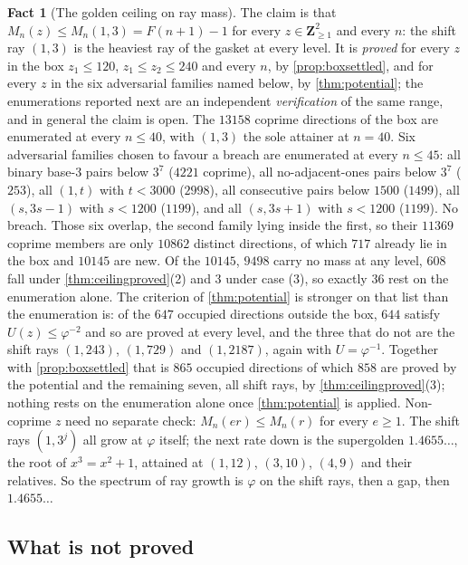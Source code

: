 \documentclass[11pt]{amsart}
\theoremstyle{definition}
\newtheorem{fact}[theorem]{Fact}
\theoremstyle{remark}
\begin{document}
\begin{fact}[The golden ceiling on ray mass]
\label{fact:ceiling}
The claim is that $M_n(z)\le M_n(1,3)=F(n+1)-1$ for every $z\in\mathbf{Z}_{\ge 1}^2$ and every $n$: the shift ray $(1,3)$ is the heaviest ray of the gasket at every level. It is \emph{proved} for every $z$ in the box $z_1\le 120$, $z_1\le z_2\le 240$ and every $n$, by \cref{prop:boxsettled}, and for every $z$ in the six adversarial families named below, by \cref{thm:potential}; the enumerations reported next are an independent \emph{verification} of the same range, and in general the claim is open. The $13158$ coprime directions of the box are enumerated at every $n\le 40$, with $(1,3)$ the sole attainer at $n=40$. Six adversarial families chosen to favour a breach are enumerated at every $n\le 45$: all binary base-$3$ pairs below $3^7$ ($4221$ coprime), all no-adjacent-ones pairs below $3^7$ ($253$), all $(1,t)$ with $t<3000$ ($2998$), all consecutive pairs below $1500$ ($1499$), all $(s,3s-1)$ with $s<1200$ ($1199$), and all $(s,3s+1)$ with $s<1200$ ($1199$). No breach. Those six overlap, the second family lying inside the first, so their $11369$ coprime members are only $10862$ distinct directions, of which $717$ already lie in the box and $10145$ are new. Of the $10145$, $9498$ carry no mass at any level, $608$ fall under \cref{thm:ceilingproved}(2) and $3$ under case (3), so exactly $36$ rest on the enumeration alone. The criterion of \cref{thm:potential} is stronger on that list than the enumeration is: of the $647$ occupied directions outside the box, $644$ satisfy $U(z)\le\varphi^{-2}$ and so are proved at every level, and the three that do not are the shift rays $(1,243)$, $(1,729)$ and $(1,2187)$, again with $U=\varphi^{-1}$. Together with \cref{prop:boxsettled} that is $865$ occupied directions of which $858$ are proved by the potential and the remaining seven, all shift rays, by \cref{thm:ceilingproved}(3); nothing rests on the enumeration alone once \cref{thm:potential} is applied. Non-coprime $z$ need no separate check: $M_n(er)\le M_n(r)$ for every $e\ge 1$. The shift rays $(1,3^j)$ all grow at $\varphi$ itself; the next rate down is the supergolden $1.4655\ldots$, the root of $x^3=x^2+1$, attained at $(1,12)$, $(3,10)$, $(4,9)$ and their relatives. So the spectrum of ray growth is $\varphi$ on the shift rays, then a gap, then $1.4655\ldots$
\end{fact}

\subsection{What is not proved}
\end{document}

